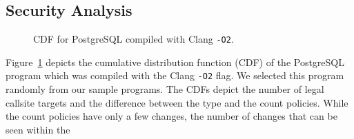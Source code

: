 \subsection{Security Analysis}
\label{RQ5: Security Analysis}
\textit{}

\begin{figure}[h] 
\hspace{-.3cm}
  \begin{minipage}[b]{1.0\linewidth}
    \centering
    \resizebox{.9\columnwidth}{!}{}
    \caption{CDF for PostgreSQL compiled with Clang \texttt{-O2}.} 
    \label{fig7} 
    \vspace{1ex}
  \end{minipage}%
\vspace{-.5cm}
\end{figure}
Figure~\ref{fig7}
depicts the cumulative distribution function (CDF) of the PostgreSQL program which was compiled with the Clang \texttt{-O2} flag. 
We selected this program randomly from our sample programs. 
The CDFs depict the number of legal callsite targets and the difference between the type and the count policies. 
While the count  policies have only a few changes, the number of changes that can be seen within the 
